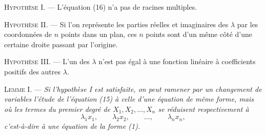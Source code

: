 \documentclass[11pt]{article}
\begin{document}
\noindent\textsc{Hypothèse I.} --- L’équation (16) n’a pas de racines multiples.

\noindent\textsc{Hypothèse II.} --- Si l’on représente les parties réelles et imaginaires des $\lambda$ par les coordonnées de $n$ points dans un plan, ces $n$ points sont d’un même côté d’une certaine droite passant par l’origine.

\noindent\textsc{Hypothèse III.} --- L’un des $\lambda$ n’est pas égal à une fonction linéaire à coefficients positifs des autres $\lambda$.

\noindent\textsc{Lemme I.} --- \emph{Si l’hypothèse I est satisfaite, on peut ramener par un changement de variables l’étude de l’équation (15) à celle d’une équation de même forme, mais où les termes du premier degré de $X_1,X_2,\ldots,X_n$ se réduisent respectivement à}
\[
\lambda_1x_1,\qquad \lambda_2x_2,\qquad \ldots,\qquad \lambda_nx_n,
\]
\emph{c’est-à-dire à une équation de la forme (1).}
\end{document}
